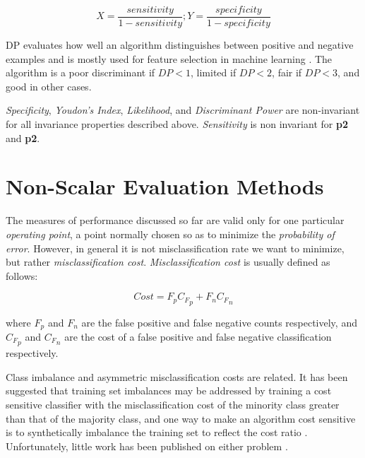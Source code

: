 \documentclass[10pt]{unbthesis}
\begin{document}
\begin{itemize}
        \begin{equation}
          \label{equ:xy}
          X = \frac{sensitivity}{1 - sensitivity}; Y =
          \frac{specificity}{1 - specificity}
        \end{equation}
        
        DP evaluates how well an algorithm distinguishes between
        positive and negative examples and is mostly used for feature
        selection in machine learning \cite{RefWorks:37}. The
        algorithm is a poor discriminant if \(DP < 1\), limited if
        \(DP < 2\), fair if \(DP < 3\), and good in other
        cases.

\end{itemize}

\textit{Specificity}, \textit{Youdon's Index}, \textit{Likelihood},
and \textit{Discriminant Power} are non-invariant for all invariance
properties described above. \textit{Sensitivity} is non invariant for
\textbf{p2} and \textbf{p2}.

\section{Non-Scalar Evaluation Methods}
The measures of performance discussed so far are valid only for one
particular \textit{operating point}, a point normally
chosen so as to minimize the \textit{probability of error}. However,
in general it is not misclassification rate we want to minimize, but
rather \textit{misclassification cost}. \textit{Misclassification
  cost} is usually defined as follows:

\begin{equation}
\label{equ:misclasscost}
Cost = F_p {C_F}_p + F_n {C_F}_n
\end{equation}

where \(F_p\) and \(F_n\) are the false positive and false negative
counts respectively, and \({C_F}_p\) and \({C_F}_n\) are the cost of a
false positive and false negative classification respectively. 

Class imbalance and asymmetric misclassification costs are related. It
has been suggested that training set imbalances may be addressed by 
training a cost sensitive classifier with the misclassification cost
of the minority class greater than that of the majority class, and one
way to make an algorithm cost sensitive is to synthetically imbalance
the training set to reflect the cost ratio
\cite{RefWorks:52}. Unfortunately, little work has been published on
either problem \cite{RefWorks:61}.
\end{document}
